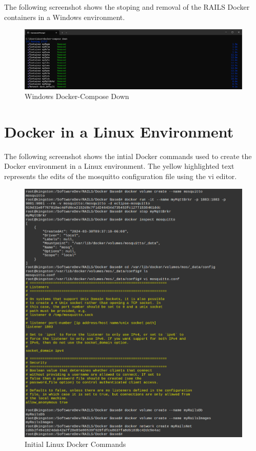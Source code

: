 The following screenshot shows the stoping and removal of the \ac{RAILS} Docker containers in a Windows environment.
\begin{figure}[H]
    \centering
    \includegraphics[scale=0.4]{win4.png}
    \caption{Windows Docker-Compose Down}
    \label{fig:docker-cmds-3}
\end{figure}
\newpage
\section{Docker in a Linux Environment}
\label{sec:linux-cmds}
The following screenshot shows the intial Docker commands used to create the Docker environment in a Linux environment. The yellow highlighted text represents the edits of the mosquitto configuration file using the vi editor.
\begin{figure}[H]
    \centering
    \includegraphics[scale=0.44]{win1l.png}
    \caption{Initial Linux Docker Commands}
    \label{fig:linux-docker-cmds}
\end{figure}
